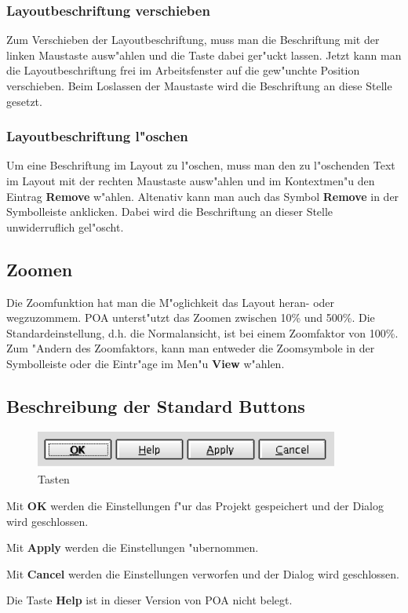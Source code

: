 \documentclass[a4paper,titlepage,12pt,ngerman]{scrbook}
\begin{document}
\subsubsection{Layoutbeschriftung verschieben}
Zum Verschieben der Layoutbeschriftung, muss man die Beschriftung mit der linken Maustaste ausw"ahlen und die Taste dabei ger"uckt lassen. Jetzt kann man die Layoutbeschriftung frei im Arbeitsfenster auf die gew"unchte Position verschieben. Beim Loslassen der Maustaste wird die Beschriftung an diese Stelle gesetzt.
\subsubsection{Layoutbeschriftung l"oschen}
Um eine Beschriftung im Layout zu l"oschen, muss man den zu l"oschenden Text im Layout mit der rechten Maustaste ausw"ahlen und im Kontextmen"u den Eintrag {\bf Remove} w"ahlen. Altenativ kann man auch das Symbol {\bf Remove} in der Symbolleiste anklicken.
Dabei wird die Beschriftung an dieser Stelle unwiderruflich gel"oscht.


\subsection{Zoomen}
Die Zoomfunktion hat man die M"oglichkeit das Layout heran- oder wegzuzommem. POA unterst"utzt das Zoomen zwischen 10{\%} und 500{\%}. Die Standardeinstellung, d.h. die Normalansicht, ist bei einem Zoomfaktor von 100\%.\newline
Zum "Andern des Zoomfaktors, kann man entweder die Zoomsymbole in der Symbolleiste oder die Eintr"age im Men"u {\bf View} w"ahlen.


\subsection{Beschreibung der Standard Buttons}
\begin{figure}[htbp]

\begin{center}

\includegraphics[width=10cm]{Button}

\caption{Tasten}\label{test}

\end{center}

\end{figure}
Mit {\bf OK} werden die Einstellungen f"ur das Projekt gespeichert und der Dialog wird geschlossen.\par
Mit {\bf Apply} werden die Einstellungen "ubernommen.\par
Mit {\bf Cancel} werden die Einstellungen verworfen und der Dialog wird geschlossen.\par
Die Taste {\bf Help} ist in dieser Version von POA nicht belegt.
\end{document}
